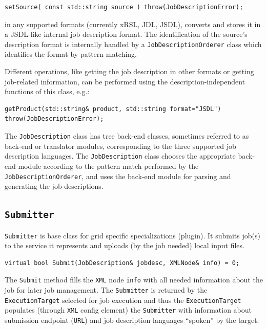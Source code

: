 \documentclass{book}
\newcommand{\ExecutionTarget}{\texttt{ExecutionTarget}}
\newcommand{\Submitter}{\texttt{Submitter}}
\newcommand{\JobDescription}{\texttt{JobDescription}}
\newcommand{\URL}{\texttt{URL}}
\newcommand{\XML}{\texttt{XML}}
\begin{document}
\begin{shaded}
\begin{verbatim}
setSource( const std::string source ) throw(JobDescriptionError);
\end{verbatim}
\end{shaded}

in any supported formats (currently xRSL, JDL, JSDL), converts and stores it in a JSDL-like internal job description format. The identification 
of the source's description format is internally handled by a \texttt{JobDescriptionOrderer} class which identifies the format by pattern
matching.

Different operations, like getting the job description in other formats or getting job-related information, can be performed using the 
description-independent functions of this class, e.g.:

\begin{shaded}
\begin{verbatim}
getProduct(std::string& product, std::string format="JSDL") throw(JobDescriptionError);
\end{verbatim}
\end{shaded}

The {\JobDescription} class has tree back-end classes, sometimes referred to as back-end or translator modules, corresponding to the three 
supported job description languages. The {\JobDescription} class chooses the appropriate back-end module according to the pattern match 
performed by the \texttt{JobDescriptionOrderer}, and uses the back-end module for parsing and generating the job descriptions.

\subsection{{\Submitter}} {\Submitter} is base class for grid specific specializations (plugin). It submits job(s) to the service 
it represents and uploads (by the job needed) local input files. 

\begin{shaded}
\begin{verbatim}
virtual bool Submit(JobDescription& jobdesc, XMLNode& info) = 0;
\end{verbatim}
\end{shaded}

The \texttt{Submit} method fills the {\XML} node \texttt{info} with all needed information about the job for later job management. 
The {\Submitter} is returned by the {\ExecutionTarget} selected for job execution and thus the {\ExecutionTarget} populates 
(through {\XML} config element) the {\Submitter} with information about submission endpoint ({\URL}) and job description languages 
``spoken'' by the target.
\end{document}
